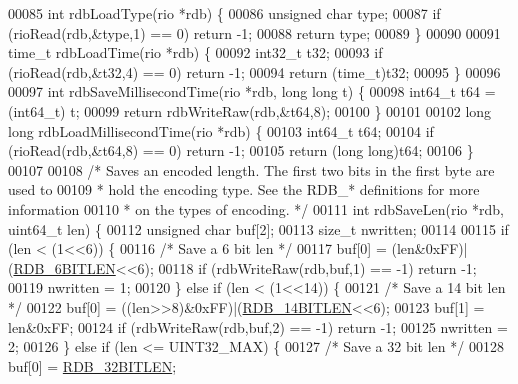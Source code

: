 \begin{DoxyCode}
{{{00085 \textcolor{keywordtype}{int} rdbLoadType(rio *rdb) \{
00086     \textcolor{keywordtype}{unsigned} \textcolor{keywordtype}{char} type;
00087     \textcolor{keywordflow}{if} (rioRead(rdb,&type,1) == 0) \textcolor{keywordflow}{return} -1;
00088     \textcolor{keywordflow}{return} type;
00089 \}
00090 
00091 time\_t rdbLoadTime(rio *rdb) \{
00092     int32\_t t32;
00093     \textcolor{keywordflow}{if} (rioRead(rdb,&t32,4) == 0) \textcolor{keywordflow}{return} -1;
00094     \textcolor{keywordflow}{return} (time\_t)t32;
00095 \}
00096 
00097 \textcolor{keywordtype}{int} rdbSaveMillisecondTime(rio *rdb, \textcolor{keywordtype}{long} \textcolor{keywordtype}{long} t) \{
00098     int64\_t t64 = (int64\_t) t;
00099     \textcolor{keywordflow}{return} rdbWriteRaw(rdb,&t64,8);
00100 \}
00101 
00102 \textcolor{keywordtype}{long} \textcolor{keywordtype}{long} rdbLoadMillisecondTime(rio *rdb) \{
00103     int64\_t t64;
00104     \textcolor{keywordflow}{if} (rioRead(rdb,&t64,8) == 0) \textcolor{keywordflow}{return} -1;
00105     \textcolor{keywordflow}{return} (\textcolor{keywordtype}{long} \textcolor{keywordtype}{long})t64;
00106 \}
00107 
00108 \textcolor{comment}{/* Saves an encoded length. The first two bits in the first byte are used to}
00109 \textcolor{comment}{ * hold the encoding type. See the RDB\_* definitions for more information}
00110 \textcolor{comment}{ * on the types of encoding. */}
00111 \textcolor{keywordtype}{int} rdbSaveLen(rio *rdb, uint64\_t len) \{
00112     \textcolor{keywordtype}{unsigned} \textcolor{keywordtype}{char} buf[2];
00113     size\_t nwritten;
00114 
00115     \textcolor{keywordflow}{if} (len < (1<<6)) \{
00116         \textcolor{comment}{/* Save a 6 bit len */}
00117         buf[0] = (len&0xFF)|(\hyperlink{rdb_8h_a11b7223b73ffc4e85093a19703362c5e}{RDB\_6BITLEN}<<6);
00118         \textcolor{keywordflow}{if} (rdbWriteRaw(rdb,buf,1) == -1) \textcolor{keywordflow}{return} -1;
00119         nwritten = 1;
00120     \} \textcolor{keywordflow}{else} \textcolor{keywordflow}{if} (len < (1<<14)) \{
00121         \textcolor{comment}{/* Save a 14 bit len */}
00122         buf[0] = ((len>>8)&0xFF)|(\hyperlink{rdb_8h_acb8ebef4cb20868b6754659c2665cc44}{RDB\_14BITLEN}<<6);
00123         buf[1] = len&0xFF;
00124         \textcolor{keywordflow}{if} (rdbWriteRaw(rdb,buf,2) == -1) \textcolor{keywordflow}{return} -1;
00125         nwritten = 2;
00126     \} \textcolor{keywordflow}{else} \textcolor{keywordflow}{if} (len <= UINT32\_MAX) \{
00127         \textcolor{comment}{/* Save a 32 bit len */}
00128         buf[0] = \hyperlink{rdb_8h_a27634f80a58e70e888a082f48a7b3a46}{RDB\_32BITLEN};
}}}
\end{DoxyCode}
